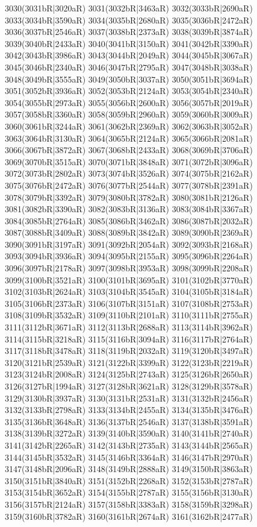 3030(3031bR|3020aR) 3031(3032bR|3463aR) 3032(3033bR|2690aR) \\3033(3034bR|3590aR) 3034(3035bR|2680aR) 3035(3036bR|2472aR) 3036(3037bR|2546aR) 3037(3038bR|2373aR) 3038(3039bR|3874aR) 3039(3040bR|2433aR) 3040(3041bR|3150aR) 3041(3042bR|3390aR) \\3042(3043bR|3986aR) 3043(3044bR|2049aR) 3044(3045bR|3067aR) 3045(3046bR|2340aR) 3046(3047bR|2795aR) 3047(3048bR|3038aR) 3048(3049bR|3555aR) 3049(3050bR|3037aR) 3050(3051bR|3694aR) \\3051(3052bR|3936aR) 3052(3053bR|2124aR) 3053(3054bR|2340aR) 3054(3055bR|2973aR) 3055(3056bR|2600aR) 3056(3057bR|2019aR) 3057(3058bR|3360aR) 3058(3059bR|2960aR) 3059(3060bR|3009aR) \\3060(3061bR|3244aR) 3061(3062bR|2369aR) 3062(3063bR|3052aR) 3063(3064bR|3130aR) 3064(3065bR|2124aR) 3065(3066bR|2081aR) 3066(3067bR|3872aR) 3067(3068bR|2433aR) 3068(3069bR|3706aR) \\3069(3070bR|3515aR) 3070(3071bR|3848aR) 3071(3072bR|3096aR) 3072(3073bR|2802aR) 3073(3074bR|3526aR) 3074(3075bR|2162aR) 3075(3076bR|2472aR) 3076(3077bR|2544aR) 3077(3078bR|2391aR) \\3078(3079bR|3392aR) 3079(3080bR|3782aR) 3080(3081bR|2126aR) 3081(3082bR|3390aR) 3082(3083bR|3136aR) 3083(3084bR|3367aR) 3084(3085bR|2764aR) 3085(3086bR|3462aR) 3086(3087bR|2032aR) \\3087(3088bR|3409aR) 3088(3089bR|3842aR) 3089(3090bR|2369aR) 3090(3091bR|3197aR) 3091(3092bR|2054aR) 3092(3093bR|2168aR) 3093(3094bR|3936aR) 3094(3095bR|2155aR) 3095(3096bR|2264aR) \\3096(3097bR|2178aR) 3097(3098bR|3953aR) 3098(3099bR|2208aR) 3099(3100bR|3521aR) 3100(3101bR|3695aR) 3101(3102bR|3770aR) 3102(3103bR|2624aR) 3103(3104bR|3545aR) 3104(3105bR|3184aR) \\3105(3106bR|2373aR) 3106(3107bR|3151aR) 3107(3108bR|2753aR) 3108(3109bR|3532aR) 3109(3110bR|2101aR) 3110(3111bR|2755aR) 3111(3112bR|3671aR) 3112(3113bR|2688aR) 3113(3114bR|3962aR) \\3114(3115bR|3218aR) 3115(3116bR|3094aR) 3116(3117bR|2764aR) 3117(3118bR|3478aR) 3118(3119bR|2032aR) 3119(3120bR|3497aR) 3120(3121bR|2539aR) 3121(3122bR|3399aR) 3122(3123bR|2219aR) \\3123(3124bR|2008aR) 3124(3125bR|2743aR) 3125(3126bR|2650aR) 3126(3127bR|1994aR) 3127(3128bR|3621aR) 3128(3129bR|3578aR) 3129(3130bR|3937aR) 3130(3131bR|2531aR) 3131(3132bR|2456aR) \\3132(3133bR|2798aR) 3133(3134bR|2455aR) 3134(3135bR|3476aR) 3135(3136bR|3648aR) 3136(3137bR|2546aR) 3137(3138bR|3591aR) 3138(3139bR|3272aR) 3139(3140bR|3590aR) 3140(3141bR|2740aR) \\3141(3142bR|2265aR) 3142(3143bR|2735aR) 3143(3144bR|2565aR) 3144(3145bR|3532aR) 3145(3146bR|3364aR) 3146(3147bR|2970aR) 3147(3148bR|2096aR) 3148(3149bR|2888aR) 3149(3150bR|3863aR) \\3150(3151bR|3840aR) 3151(3152bR|2268aR) 3152(3153bR|2787aR) 3153(3154bR|3652aR) 3154(3155bR|2787aR) 3155(3156bR|3130aR) 3156(3157bR|2124aR) 3157(3158bR|3383aR) 3158(3159bR|3298aR) \\3159(3160bR|3782aR) 3160(3161bR|2674aR) 3161(3162bR|2477aR) 
